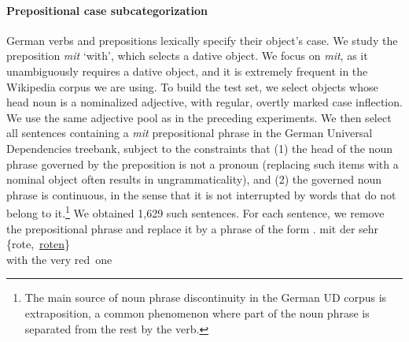 \paragraph{Prepositional case subcategorization}
German verbs and prepositions lexically specify their object's case.  We
study the preposition \textit{mit} `with', which selects a dative
object. We focus on \textit{mit}, as it unambiguously requires a dative object,
and it is extremely frequent in the Wikipedia corpus we are using. To build the test set,
we select objects whose head noun is a nominalized adjective,
with regular, overtly marked case inflection.
We use the same adjective pool as in the preceding experiments.
We then select all sentences containing a \emph{mit} prepositional
phrase in the German Universal Dependencies treebank, subject to the
constraints that (1) the head of the noun phrase governed by the
preposition is not a pronoun (replacing such items with a nominal
object often results in ungrammaticality), and (2) the governed noun
phrase is continuous, in the sense that it is not interrupted by words
that do not belong to it.\footnote{The main source of noun phrase
  discontinuity in the German UD corpus is extraposition, a common
  phenomenon where part of the noun phrase is separated from the rest
  by the verb.} %
We obtained 1,629 such sentences.  For each sentence, we remove the
prepositional phrase and replace it by a phrase of the form
\exg. mit der sehr \{rote,\ \underline{roten}\} \\
with the very red\ one \\

